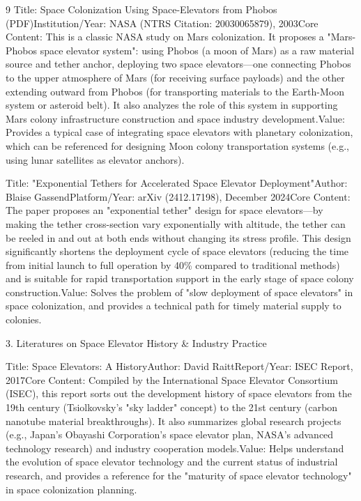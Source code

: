 \begin{ReportAiUse}{9}
Title: Space Colonization Using Space-Elevators from Phobos (PDF)Institution/Year: NASA (NTRS Citation: 20030065879), 2003Core Content: This is a classic NASA study on Mars colonization. It proposes a "Mars-Phobos space elevator system": using Phobos (a moon of Mars) as a raw material source and tether anchor, deploying two space elevators—one connecting Phobos to the upper atmosphere of Mars (for receiving surface payloads) and the other extending outward from Phobos (for transporting materials to the Earth-Moon system or asteroid belt). It also analyzes the role of this system in supporting Mars colony infrastructure construction and space industry development.Value: Provides a typical case of integrating space elevators with planetary colonization, which can be referenced for designing Moon colony transportation systems (e.g., using lunar satellites as elevator anchors).


Title: "Exponential Tethers for Accelerated Space Elevator Deployment"Author: Blaise GassendPlatform/Year: arXiv (2412.17198), December 2024Core Content: The paper proposes an "exponential tether" design for space elevators—by making the tether cross-section vary exponentially with altitude, the tether can be reeled in and out at both ends without changing its stress profile. This design significantly shortens the deployment cycle of space elevators (reducing the time from initial launch to full operation by 40\% compared to traditional methods) and is suitable for rapid transportation support in the early stage of space colony construction.Value: Solves the problem of "slow deployment of space elevators" in space colonization, and provides a technical path for timely material supply to colonies.

3. Literatures on Space Elevator History & Industry Practice

Title: Space Elevators: A HistoryAuthor: David RaittReport/Year: ISEC Report, 2017Core Content: Compiled by the International Space Elevator Consortium (ISEC), this report sorts out the development history of space elevators from the 19th century (Tsiolkovsky’s "sky ladder" concept) to the 21st century (carbon nanotube material breakthroughs). It also summarizes global research projects (e.g., Japan’s Obayashi Corporation’s space elevator plan, NASA’s advanced technology research) and industry cooperation models.Value: Helps understand the evolution of space elevator technology and the current status of industrial research, and provides a reference for the "maturity of space elevator technology" in space colonization planning.



\end{ReportAiUse}
